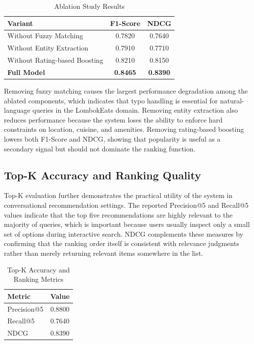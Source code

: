 \documentclass[conference]{IEEEtran}
\begin{document}
\begin{table}[htbp]
\caption{Ablation Study Results}
\begin{center}
\begin{tabular}{|l|c|c|}
\hline
\textbf{Variant} & \textbf{F1-Score} & \textbf{NDCG} \\
\hline
Without Fuzzy Matching & 0.7820 & 0.7640 \\
Without Entity Extraction & 0.7910 & 0.7710 \\
Without Rating-based Boosting & 0.8210 & 0.8150 \\
\textbf{Full Model} & \textbf{0.8465} & \textbf{0.8390} \\
\hline
\end{tabular}
\end{center}
\end{table}

Removing fuzzy matching causes the largest performance degradation among the ablated components, which indicates that typo handling is essential for natural-language queries in the LombokEats domain\cite{b7,b13}. Removing entity extraction also reduces performance because the system loses the ability to enforce hard constraints on location, cuisine, and amenities\cite{b16,b14}. Removing rating-based boosting lowers both F1-Score and NDCG, showing that popularity is useful as a secondary signal but should not dominate the ranking function\cite{b8,b10}.

\subsection{Top-K Accuracy and Ranking Quality}
Top-K evaluation further demonstrates the practical utility of the system in conversational recommendation settings. The reported Precision@5 and Recall@5 values indicate that the top five recommendations are highly relevant to the majority of queries, which is important because users usually inspect only a small set of options during interactive search\cite{b6,b10}. NDCG complements these measures by confirming that the ranking order itself is consistent with relevance judgments rather than merely returning relevant items somewhere in the list\cite{b6,b11}.

\begin{table}[htbp]
\caption{Top-K Accuracy and Ranking Metrics}
\begin{center}
\begin{tabular}{|l|c|}
\hline
\textbf{Metric} & \textbf{Value} \\
\hline
Precision@5 & 0.8800 \\
Recall@5 & 0.7640 \\
NDCG & 0.8390 \\
\hline
\end{tabular}
\end{center}
\end{table}
\end{document}
